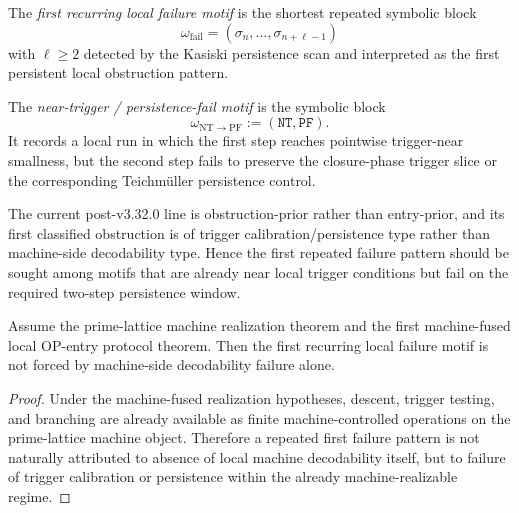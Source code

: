 \begin{definition}
\label{def:first-recurring-local-failure-motif}
The \emph{first recurring local failure motif} is the shortest repeated symbolic block
\[
\omega_{\mathrm{fail}}
=
(\sigma_n,\dots,\sigma_{n+\ell-1})
\]
with \(\ell\ge 2\) detected by the Kasiski persistence scan and interpreted as the first persistent local obstruction pattern.
\end{definition}

\begin{definition}
\label{def:near-trigger-persistence-fail-motif}
The \emph{near-trigger / persistence-fail motif} is the symbolic block
\[
\omega_{\mathrm{NT\to PF}}
:=
(\mathtt{NT},\mathtt{PF}).
\]
It records a local run in which the first step reaches pointwise trigger-near smallness, but the second step fails to preserve the closure-phase trigger slice or the corresponding Teichm\"uller persistence control.
\end{definition}

\begin{remark}
\label{rem:why-natural-first-failure-candidate}
The current post-v3.32.0 line is obstruction-prior rather than entry-prior, and its first classified obstruction is of trigger calibration/persistence type rather than machine-side decodability type.
Hence the first repeated failure pattern should be sought among motifs that are already near local trigger conditions but fail on the required two-step persistence window.
\end{remark}

\begin{proposition}
\label{prop:machine-side-decodability-not-first-recurring-failure-source}
Assume the prime-lattice machine realization theorem and the first machine-fused local OP-entry protocol theorem.
Then the first recurring local failure motif is not forced by machine-side decodability failure alone.
\end{proposition}

\begin{proof}
Under the machine-fused realization hypotheses, descent, trigger testing, and branching are already available as finite machine-controlled operations on the prime-lattice machine object.
Therefore a repeated first failure pattern is not naturally attributed to absence of local machine decodability itself, but to failure of trigger calibration or persistence within the already machine-realizable regime.
\end{proof}

